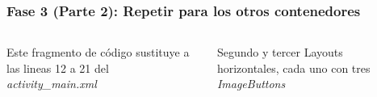 \begin{frame}[fragile]
\frametitle{Fase 3 (Parte 2): Repetir para los otros contenedores} 
\begin{columns}
Este fragmento de c\'odigo sustituye a las lineas 12 a 21 del \textit{activity\_main.xml}
\begin{block}{Segundo y tercer Layouts horizontales, cada uno con tres \textit{ImageButtons}}
\inputminted[linenos,fontsize=\tiny]{xml}{00_CambiosInterfaz/Layout_Fase3B.xml}
\end{block}
\begin{center}
\end{center}
\end{columns}
\end{frame}



